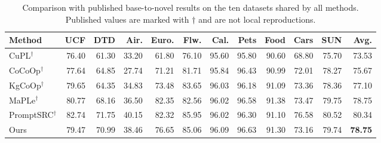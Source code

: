\begin{table}[t]
\centering
\caption{Comparison with published base-to-novel results on the ten datasets shared by all methods. Published values are marked with $\dagger$ and are not local reproductions.}
\label{tab:ten-dataset-literature}
\small
\setlength{\tabcolsep}{3.0pt}
\begin{tabular}{lrrrrrrrrrrr}
\toprule
Method & UCF & DTD & Air. & Euro. & Flw. & Cal. & Pets & Food & Cars & SUN & Avg. \\
\midrule
CuPL$^\dagger$ & 76.40 & 61.30 & 33.20 & 61.80 & 76.10 & 95.60 & 95.80 & 90.60 & 68.80 & 75.70 & 73.53 \\
CoCoOp$^\dagger$ & 77.64 & 64.85 & 27.74 & 71.21 & 81.71 & 95.84 & 96.43 & 90.99 & 72.01 & 78.27 & 75.67 \\
KgCoOp$^\dagger$ & 79.65 & 64.35 & 34.83 & 73.48 & 83.65 & 96.03 & 96.18 & 91.09 & 73.36 & 78.36 & 77.10 \\
MaPLe$^\dagger$ & 80.77 & 68.16 & 36.50 & 82.35 & 82.56 & 96.02 & 96.58 & 91.38 & 73.47 & 79.75 & 78.75 \\
PromptSRC$^\dagger$ & 82.74 & 71.75 & 40.15 & 82.32 & 85.95 & 96.02 & 96.30 & 91.10 & 76.58 & 80.52 & 80.34 \\
Ours & 79.47 & 70.99 & 38.46 & 76.65 & 85.06 & 96.09 & 96.63 & 91.30 & 73.16 & 79.74 & \textbf{78.75} \\
\bottomrule
\end{tabular}
\end{table}
